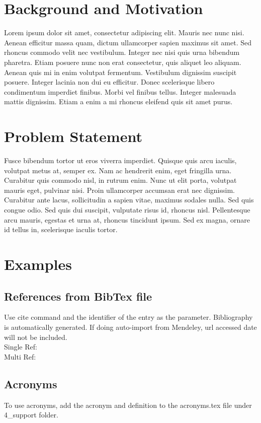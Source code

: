 \section{Background and Motivation}
    Lorem ipsum dolor sit amet, consectetur adipiscing elit. Mauris nec nunc nisi. Aenean efficitur massa quam, dictum ullamcorper sapien maximus sit amet. Sed rhoncus commodo velit nec vestibulum. Integer nec nisi quis urna bibendum pharetra. Etiam posuere nunc non erat consectetur, quis aliquet leo aliquam. Aenean quis mi in enim volutpat fermentum. Vestibulum dignissim suscipit posuere. Integer lacinia non dui eu efficitur. Donec scelerisque libero condimentum imperdiet finibus. Morbi vel finibus tellus. Integer malesuada mattis dignissim. Etiam a enim a mi rhoncus eleifend quis sit amet purus.

\section{Problem Statement}
    Fusce bibendum tortor ut eros viverra imperdiet. Quisque quis arcu iaculis, volutpat metus at, semper ex. Nam ac hendrerit enim, eget fringilla urna. Curabitur quis commodo nisl, in rutrum enim. Nunc ut elit porta, volutpat mauris eget, pulvinar nisi. Proin ullamcorper accumsan erat nec dignissim. Curabitur ante lacus, sollicitudin a sapien vitae, maximus sodales nulla. Sed quis congue odio. Sed quis dui suscipit, vulputate risus id, rhoncus nisl. Pellentesque arcu mauris, egestas et urna at, rhoncus tincidunt ipsum. Sed ex magna, ornare id tellus in, scelerisque iaculis tortor.
    
\section{Examples}
\subsection{References from BibTex file}
    Use cite command and the identifier of the entry as the parameter. Bibliography is automatically generated. If doing auto-import from Mendeley, url accessed date will not be included.\\
    Single Ref:    \cite{NHTSA2010OdometerFraud} \\
    Multi Ref:     \cite{NHTSA2010OdometerFraud,NHTSA2010OdometerFraud}\\
\subsection{Acronyms}
    To use acronyms, add the acronym and definition to the acronyms.tex file under 4\_support folder.
    
